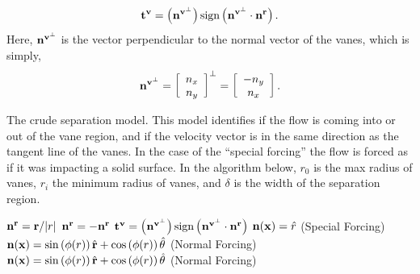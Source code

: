 \begin{equation}
 \bf t^v = \left( {\bf n^{v^\perp}} \right) \text{sign}\left(
	    {\bf n^{v^\perp}} \cdot {\bf n^r} \right).
\end{equation}
Here, ${\bf n^{v^\perp}}$ is the vector perpendicular to the normal
vector of the vanes, which is simply, 
\begin{equation*}
 {\bf n^{v^\perp}} = \left[ \begin{array}{c}
n_x\\
n_y\\
\end{array}\right]^{\perp} = 
 \left[ \begin{array}{c}
  -n_y\\
  n_x\\
	\end{array}\right].
\end{equation*}

%
%

\begin{center}
 \begin{algorithm}
  \caption{The crude separation model. This model identifies if the flow
  is coming into or out of the vane region, and if the velocity vector
  is in the same direction as the tangent line of the vanes. In the case
  of the ``special forcing'' the flow is forced as if it was
  impacting a solid surface. In the
  algorithm below, $r_0$ is the max radius of vanes, $r_i$ the minimum
  radius of vanes, and $\delta$ is the width of the separation region.}
  \label{alg:sep}
  \begin{algorithmic}
   \STATE ${\bf n^r} = {\bf r}/|r|$
   \STATE ${\bf n^r} = -{\bf n^r}$
   \ENDIF
   \STATE  $\bf t^v = \left( {\bf n^{v^\perp}} \right) \text{sign}\left(
  	    {\bf n^{v^\perp}} \cdot {\bf n^r} \right)$
   \STATE ${\bf n}({\bf x}) = \hat r$ \quad (Special Forcing)
   \ELSE
   \STATE  ${\bf n}({\bf x}) = \sin \left(\phi(r) \right) \hat{{\bf r}}+ \cos
  \left(\phi(r) \right) \hat{{\bf \theta}} $
  \quad (Normal Forcing)
   \ENDIF
   \ELSE
   \STATE ${\bf n}({\bf x}) = \sin \left(\phi(r) \right) \hat{{\bf r}}+ \cos
  \left(\phi(r) \right) \hat{{\bf \theta}} $
  \quad (Normal Forcing)
   \ENDIF
   \ENDIF
  \end{algorithmic}
 \end{algorithm}
\end{center}


